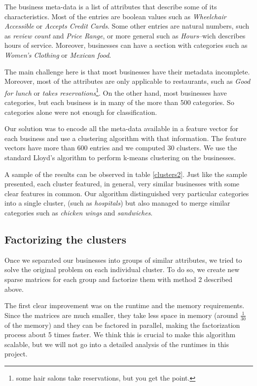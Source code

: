 \documentclass[12pt]{article}
\begin{document}
The business meta-data is a list of attributes that describe some of its characteristics. Most of the entries are boolean values such as \emph{Wheelchair Accessible} or \emph{Accepts Credit Cards}. Some other entries are natural numbers, such as \emph{review count} and \emph{Price Range}, or more general such as \emph{Hours}--wich describes hours of service. Moreover, businesses can have a section with categories such as \emph{Women's Clothing} or \emph{Mexican food}.

The main challenge here is that most businesses have their metadata incomplete. Moreover, most of the attributes are only applicable to restaurants, such as \emph{Good for lunch} or \emph{takes reservations}\footnote{some hair salons take reservations, but you get the point.}. On the other hand, most businesses have categories, but each business is in many of the more than 500 categories. So categories alone were not enough for classification. 

Our solution was to encode all the meta-data available in a feature vector for each business and use a clustering algorithm with that information. The feature vectors have more than 600 entries and we computed 30 clusters. We use the standard Lloyd's algorithm \cite{lamport94} to perform k-means clustering on the businesses.  

A sample of the results can be observed in table \ref{clusters2}. Just like the sample presented, each cluster featured, in general, very similar businesses with some clear features in common. Our algorithm distinguished very particular categories into a single cluster, (such as \emph{hospitals}) but also managed to merge similar categories such as \emph{chicken wings} and \emph{sandwiches}.


\subsection{Factorizing the clusters}

Once we separated our businesses into groups of similar attributes, we tried to solve the original problem on each individual cluster. To do so, we create new sparse matrices for each group and factorize them with method 2 described above. 

The first clear improvement was on the runtime and the memory requirements. Since the matrices are much smaller, they take less space in memory (around $\frac{1}{30}$ of the memory) and they can be factored in parallel, making the factorization process about 5 times faster. We think this is crucial to make this algorithm scalable, but we will not go into a detailed analysis of the runtimes in this project.
\end{document}
